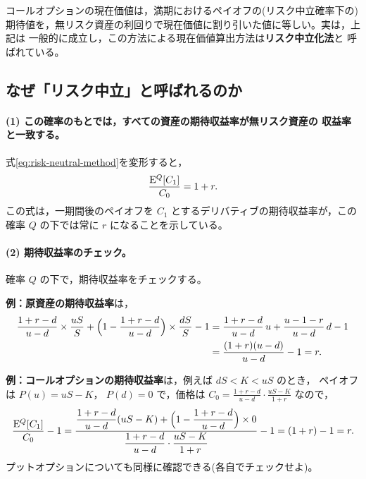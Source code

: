 \begin{keypoint}[リスク中立化法]
コールオプションの現在価値は，満期におけるペイオフの(リスク中立確率下の)
期待値を，無リスク資産の利回りで現在価値に割り引いた値に等しい。実は，上記は
一般的に成立し，この方法による現在価値算出方法は\textbf{リスク中立化法}と
呼ばれている。
\end{keypoint}

\subsection{なぜ「リスク中立」と呼ばれるのか}

\paragraph{(1) この確率のもとでは，すべての資産の期待収益率が無リスク資産の
収益率と一致する。}
式\eqref{eq:risk-neutral-method}を変形すると，
\begin{equation}
\frac{\mathrm{E}^Q[C_1]}{C_0} = 1 + r.
\end{equation}
この式は，一期間後のペイオフを $C_1$ とするデリバティブの期待収益率が，この
確率 $Q$ の下では常に $r$ になることを示している。

\paragraph{(2) 期待収益率のチェック。}
確率 $Q$ の下で，期待収益率をチェックする。

\textbf{例：原資産の期待収益率}は，
\begin{align*}
\frac{1+r-d}{u-d}\times\frac{uS}{S}
+ \Bigl(1-\frac{1+r-d}{u-d}\Bigr)\times\frac{dS}{S} - 1
&= \frac{1+r-d}{u-d}\,u + \frac{u-1-r}{u-d}\,d - 1\\
&= \frac{(1+r)(u-d)}{u-d} - 1 = r.
\end{align*}

\textbf{例：コールオプションの期待収益率}は，例えば $dS < K < uS$ のとき，
ペイオフは $P(u) = uS-K$， $P(d) = 0$ で，価格は
$C_0 = \frac{1+r-d}{u-d}\cdot\frac{uS-K}{1+r}$ なので，
\[
\frac{\mathrm{E}^Q[C_1]}{C_0} - 1
= \frac{\dfrac{1+r-d}{u-d}(uS-K) + \Bigl(1-\dfrac{1+r-d}{u-d}\Bigr)\times 0}
{\dfrac{1+r-d}{u-d}\cdot\dfrac{uS-K}{1+r}} - 1
= (1+r) - 1 = r.
\]
プットオプションについても同様に確認できる(各自でチェックせよ)。

